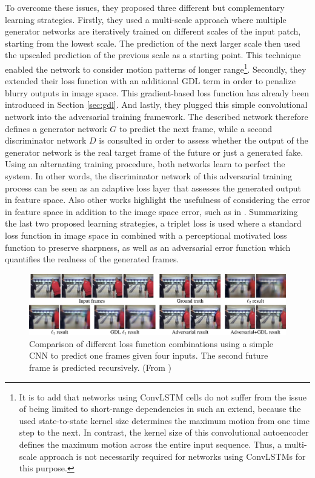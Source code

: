 To overcome these issues, they proposed three different but complementary learning strategies. Firstly, they used a multi-scale approach where multiple generator networks are iteratively trained on different scales of the input patch, starting from the lowest scale. The prediction of the next larger scale then used the upscaled prediction of the previous scale as a starting point. This technique enabled the network to consider motion patterns of longer range\footnote{It is to add that networks using ConvLSTM cells do not suffer from the issue of being limited to short-range dependencies in such an extend, because the used state-to-state kernel size determines the maximum motion from one time step to the next. In contrast, the kernel size of this convolutional autoencoder defines the maximum motion across the entire input sequence. Thus, a multi-scale approach is not necessarily required for networks using ConvLSTMs for this purpose.}. Secondly, they extended their loss function with an additional GDL term in order to penalize blurry outputs in image space. This gradient-based loss function has already been introduced in Section \ref{sec:gdl}. And lastly, they plugged this simple convolutional network into the adversarial training framework. The described network therefore defines a generator network $G$ to predict the next frame, while a second discriminator network $D$ is consulted in order to assess whether the output of the generator network is the real target frame of the future or just a generated fake. Using an alternating training procedure, both networks learn to perfect the system. In other words, the discriminator network of this adversarial training process can be seen as an adaptive loss layer that assesses the generated output in feature space. Also other works highlight the usefulness of considering the error in feature space in addition to the image space error, such as in \parencite{gen_img_perc_sim}. Summarizing the last two proposed learning strategies, a triplet loss is used where a standard loss function in image space in combined with a perceptional motivated loss function to preserve sharpness, as well as an adversarial error function which quantifies the realness of the generated frames. 

\begin{figure}[htb]
	\centering
	\includegraphics[width=1.0\linewidth]{figures/related/deep_multiscale_samples.png} 
	\caption[Comparion of Loss Functions in GAN Model]{Comparison of different loss function combinations using a simple CNN to predict one frames given four inputs. The second future frame is predicted recursively. (From \parencite{deep_multiscale_video_pred})} \label{fig:gan_samples}
\end{figure}

